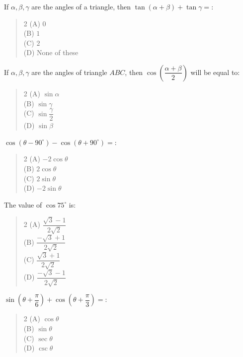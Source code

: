 \documentclass[11pt,a4paper]{article}
\begin{document}
\begin{mcqlist}
\item If $\alpha,\beta,\gamma$ are the angles of a triangle, then $\tan(\alpha+\beta)+\tan\gamma = $:
\begin{quote}\begin{multicols}{2}
\noindent (A) $0$ \\
(B) $1$ \\
(C) $2$ \\
(D) None of these
\end{multicols}\end{quote}

\item If $\alpha,\beta,\gamma$ are the angles of triangle $ABC$, then $\cos\left(\dfrac{\alpha+\beta}{2}\right)$ will be equal to:
\begin{quote}\begin{multicols}{2}
\noindent (A) $\sin\alpha$ \\
(B) $\sin\gamma$ \\
(C) $\sin\dfrac{\gamma}{2}$ \\
(D) $\sin\beta$
\end{multicols}\end{quote}

\item $\cos(\theta-90^{\circ})-\cos(\theta+90^{\circ}) = $:
\begin{quote}\begin{multicols}{2}
\noindent (A) $-2\cos\theta$ \\
(B) $2\cos\theta$ \\
(C) $2\sin\theta$ \\
(D) $-2\sin\theta$
\end{multicols}\end{quote}

\item The value of $\cos75^{\circ}$ is:
\begin{quote}\begin{multicols}{2}
\noindent (A) $\dfrac{\sqrt{3}-1}{2\sqrt{2}}$ \\
(B) $\dfrac{-\sqrt{3}+1}{2\sqrt{2}}$ \\
(C) $\dfrac{\sqrt{3}+1}{2\sqrt{2}}$ \\
(D) $\dfrac{-\sqrt{3}-1}{2\sqrt{2}}$
\end{multicols}\end{quote}

\item $\sin\left(\theta+\dfrac{\pi}{6}\right)+\cos\left(\theta+\dfrac{\pi}{3}\right) = $:
\begin{quote}\begin{multicols}{2}
\noindent (A) $\cos\theta$ \\
(B) $\sin\theta$ \\
(C) $\sec\theta$ \\
(D) $\csc\theta$
\end{multicols}\end{quote}


\end{mcqlist}
\end{document}
